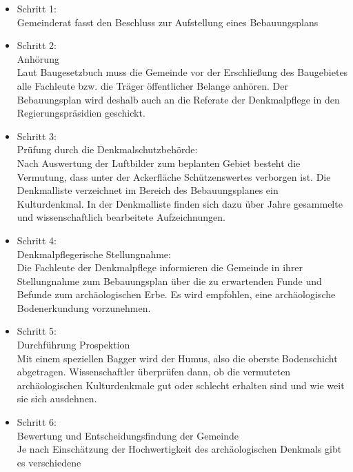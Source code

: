 \documentclass[fleqn,twoside,dvipsnames]{article}
\begin{document}
        \begin{itemize}
            \item Schritt 1:\\ Gemeinderat fasst den Beschluss zur
            Aufstellung eines Bebauungsplans
            \item Schritt 2:\\ Anhörung\\
            Laut Baugesetzbuch muss die Gemeinde vor der
            Erschließung des Baugebietes alle Fachleute bzw.
            die Träger öffentlicher Belange anhören. Der
            Bebauungsplan wird deshalb auch an die Referate
            der Denkmalpflege in den Regierungspräsidien
            geschickt.
            \item Schritt 3:\\ Prüfung durch die Denkmalschutzbehörde:\\
            Nach Auswertung der Luftbilder zum beplanten Gebiet
            besteht die Vermutung, dass unter der Ackerfläche
            Schützenswertes verborgen ist.
            Die Denkmalliste verzeichnet im Bereich des
            Bebauungsplanes ein Kulturdenkmal. In der
            Denkmalliste finden sich dazu über Jahre gesammelte
            und wissenschaftlich bearbeitete Aufzeichnungen.
            \item Schritt 4:\\ Denkmalpflegerische Stellungnahme:\\
            Die Fachleute der Denkmalpflege informieren die
            Gemeinde in ihrer Stellungnahme zum Bebauungsplan
            über die zu erwartenden Funde und Befunde zum
            archäologischen Erbe. Es wird empfohlen, eine
            archäologische Bodenerkundung vorzunehmen.
            \item Schritt 5:\\ Durchführung Prospektion\\
            Mit einem speziellen Bagger wird der Humus, also die
            oberste Bodenschicht abgetragen. Wissenschaftler
            überprüfen dann, ob die vermuteten archäologischen
            Kulturdenkmale gut oder schlecht erhalten sind und wie
            weit sie sich ausdehnen.
            \item Schritt 6:\\ Bewertung und Entscheidungsfindung der
            Gemeinde\\
            Je nach Einschätzung der Hochwertigkeit des
            archäologischen Denkmals gibt es verschiedene

\end{itemize}
\end{document}
